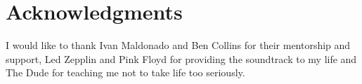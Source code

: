 \chapter*{Acknowledgments}
I would like to thank Ivan Maldonado and Ben Collins for their mentorship and support, Led Zepplin and Pink Floyd for providing the soundtrack to my life and The Dude for teaching me not to take life too seriously.  